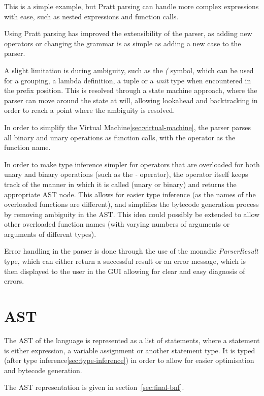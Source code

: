 This is a simple example, but Pratt parsing can handle more complex expressions with ease, such as nested
expressions and function calls.

Using Pratt parsing has improved the extensibility of the parser, as adding new operators or changing the grammar
is as simple as adding a new case to the parser.

A slight limitation is during ambiguity, such as the \textit{(} symbol, which can be used for a grouping, a lambda 
definition, a tuple or a \textit{unit} type when encountered in the prefix position.
This is resolved through a state machine approach, where the parser can move around the state at will, allowing 
lookahead and backtracking in order to reach a point where the ambiguity is resolved.

In order to simplify the Virtual Machine\ref{sec:virtual-machine}, the parser parses all binary and unary operations 
as function calls, with the operator as the function name.

In order to make type inference simpler for operators that are overloaded for both unary and binary operations (such 
as the \textit{-} operator), the operator itself keeps track of the manner in which it is called (unary or binary) and
returns the appropriate AST node. 
This allows for easier type inference (as the names of the overloaded functions are different), 
and simplifies the bytecode generation process by removing ambiguity in the AST\@.
This idea could possibly be extended to allow other overloaded function names (with varying numbers of arguments or 
arguments of different types).

Error handling in the parser is done through the use of the monadic \textit{ParserResult} type, which can either 
return a successful result or an error message, which is then displayed to the user in the GUI allowing for clear 
and easy diagnosis of errors.

\section{AST}\label{sec:expression}

The AST of the language is represented as a list of statements, where a statement is either expression, a
variable assignment or another statement type.
It is typed (after type inference\ref{sec:type-inference}) in order to allow for easier optimisation and
bytecode generation.

The AST representation is given in section~\ref{sec:final-bnf}.

